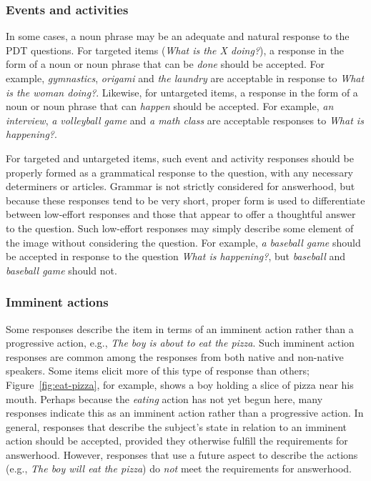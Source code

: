\documentclass[12pt,notitlepage]{article}
\begin{document}
\subsubsection{Events and activities}
\label{subsubsection:answerhood-events} In some cases, a noun phrase may be an adequate and natural response to the PDT questions. For targeted items (\textit{What is the X doing?}), a response in the form of a noun or noun phrase that can be \textit{done} should be accepted. For example, \textit{gymnastics}, \textit{origami} and \textit{the laundry} are acceptable in response to \textit{What is the woman doing?}. Likewise, for untargeted items, a response in the form of a noun or noun phrase that can \textit{happen} should be accepted. For example, \textit{an interview}, \textit{a volleyball game} and \textit{a math class} are acceptable responses to \textit{What is happening?}.

For targeted and untargeted items, such event and activity responses should be properly formed as a grammatical response to the question, with any necessary determiners or articles. Grammar is not strictly considered for answerhood, but because these responses tend to be very short, proper form is used to differentiate between low-effort responses and those that appear to offer a thoughtful answer to the question. Such low-effort responses may simply describe some element of the image without considering the question. For example, \textit{a baseball game} should be accepted in response to the question \textit{What is happening?}, but \textit{baseball} and \textit{baseball game} should not.

\subsubsection{Imminent actions}
\label{subsubsection:answerhood-imminent}
Some responses describe the item in terms of an imminent action rather than a progressive action, e.g., \textit{The boy is about to eat the pizza}. Such imminent action responses are common among the responses from both native and non-native speakers. Some items elicit more of this type of response than others; Figure~\ref{fig:eat-pizza}, for example, shows a boy holding a slice of pizza near his mouth. Perhaps because the \textit{eating} action has not yet begun here, many responses indicate this as an imminent action rather than a progressive action. In general, responses that describe the subject's state in relation to an imminent action should be accepted, provided they otherwise fulfill the requirements for answerhood. However, responses that use a future aspect to describe the actions (e.g., \textit{The boy will eat the pizza}) do \textit{not} meet the requirements for answerhood.
\end{document}
